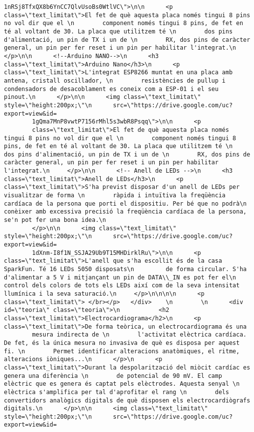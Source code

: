 \begin{lstlisting}[style=myArduino]
        1nRSj8TfxQX8b6YnCC7QlvUsoBs0WtlVC\">\n\n      <p class=\"text_limitat\">El fet de què aquesta placa només tingui 8 pins no vol dir que el \n        component només tingui 8 pins, de fet en té al voltant de 30. La placa que utilitzem té \n        dos pins d'alimentació, un pin de TX i un de \n        RX, dos pins de caràcter general, un pin per fer reset i un pin per habilitar l'integrat.\n      </p>\n\n      <!--Arduino NANO-->\n      <h3 class=\"text_limitat\">Arduino Nano</h3>\n      <p class=\"text_limitat\">L'integrat ESP8266 muntat en una placa amb antena, cristall oscillador, \n        resistències de pullup i condensadors de desacoblament es coneix com a ESP-01 i el seu pinout.\n      </p>\n\n      <img class=\"text_limitat\" style=\"height:200px;\"\n      src=\"https://drive.google.com/uc?export=view&id=
        1gQma7MnP8vwtP7156rMhl5s3wbR8Psqq\">\n\n      <p 
        class=\"text_limitat\">El fet de què aquesta placa només tingui 8 pins no vol dir que el \n        component només tingui 8 pins, de fet en té al voltant de 30. La placa que utilitzem té \n        dos pins d'alimentació, un pin de TX i un de \n        RX, dos pins de caràcter general, un pin per fer reset i un pin per habilitar l'integrat.\n     </p>\n\n      <!-- Anell de LEDs -->\n      <h3 class=\"text_limitat\">Anell de LEDs</h3>\n      <p class=\"text_limitat\">S'ha previst disposar d'un anell de LEDs per visualitzar de forma \n        ràpida i intuïtiva la freqüència cardíaca de la persona que porti el dispositiu. Per bé que no podrà\n         conèixer amb excessiva precisió la freqüència cardíaca de la persona, se'n pot fer una bona idea.\n      
        </p>\n\n      <img class=\"text_limitat\" style=\"height:200px;\"\n      src=\"https://drive.google.com/uc?export=view&id=
        1dXnm-I8f1N_SSJA29Ub9T15MHDirklRu\">\n\n      <p class=\"text_limitat\">L'anell que s'ha escollit és de la casa SparkFun. Té 16 LEDs 5050 disposats\n         de forma circular. S'ha d'alimentar a 5 V i mitjançant un pin de DATA\\_IN es pot fer el\n         control dels colors de tots els LEDs així com de la seva intensitat llumínica i la seva saturació.\n     </p>\n\n\n\n      <p class=\"text_limitat\"> </br></p>   </div>    \n        \n      <div id=\"teoria\" class=\"teoria\">\n           <h2 class=\"text_limitat\">Electrocardiograma</h2>\n      <p class=\"text_limitat\">De forma teòrica, un electrocardiograma és una 
        mesura indirecta de \n        l'activitat elèctrica cardíaca. De fet, és la única mesura no invasiva de què es disposa per aquest fi. \n        Permet identificar alteracions anatòmiques, el ritme, alteracions iòniques...\n      </p>\n      <p class=\"text_limitat\">Durant la despolarització del miòcit cardíac es genera una diferència \n        de potencial de 90 mV. El camp elèctric que es genera és captat pels elèctrodes. Aquesta senyal \n        elèctrica s'amplifica per tal d'aprofitar el rang \n        dels convertidors analògics digitals de què disposen els electrocardiògrafs digitals.\n      </p>\n\n      <img class=\"text_limitat\" style=\"height:200px;\"\n      src=\"https://drive.google.com/uc?export=view&id=

\end{lstlisting}
